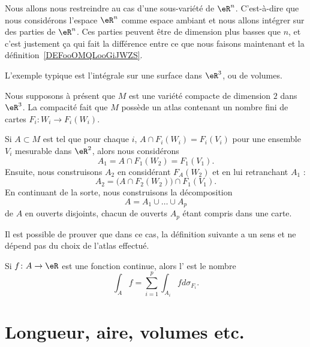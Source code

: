 Nous allons nous restreindre au cas d'une sous-variété de \( \eR^n\). C'est-à-dire que nous considérons l'espace \( \eR^n\) comme espace ambiant et nous allons intégrer sur des parties de \( \eR^n\). Ces parties peuvent être de dimension plus basses que \( n\), et c'est justement ça qui fait la différence entre ce que nous faisons maintenant et la définition~\ref{DEFooOMQLooGiJWZS}.

L'exemple typique est l'intégrale sur une surface dans \( \eR^3\), ou de volumes.

Nous supposons à présent que $M$ est une variété compacte de dimension $2$ dans $\eR^3$. La compacité fait que $M$ possède un atlas contenant un nombre fini de cartes $F_i\colon W_i\to F_i(W_i)$.

Si $A\subset M$ est tel que pour chaque $i$, $A\cap F_i(W_i)=F_i(V_i)$ pour une ensemble $V_i$ mesurable dans $\eR^2$, alors nous considérons
\begin{equation}
	A_1=A\cap F_1(W_2)=F_1(V_1).
\end{equation}
Ensuite, nous construisons $A_2$ en considérant $F_A(W_2)$ et en lui retranchant $A_1$ :
\begin{equation}
	A_2=\big( A\cap F_2(W_2) \big)\cap F_1(V_1).
\end{equation}
En continuant de la sorte, nous construisons la décomposition
\begin{equation}
	A=A_1\cup\ldots\cup A_p
\end{equation}
de $A$ en ouverts disjoints, chacun de ouverts $A_p$ étant compris dans une carte.

Il est possible de prouver que dans ce cas, la définition suivante a un sens et ne dépend pas du choix de l'atlas effectué.
\begin{definition}
	Si $f\colon A\to \eR$ est une fonction continue, alors l' est le nombre
	\begin{equation}
		\int_Af=\sum_{i=1}^p\int_{A_i}fd\sigma_{F_i}.
	\end{equation}
\end{definition}

\section{Longueur, aire, volumes etc.}

